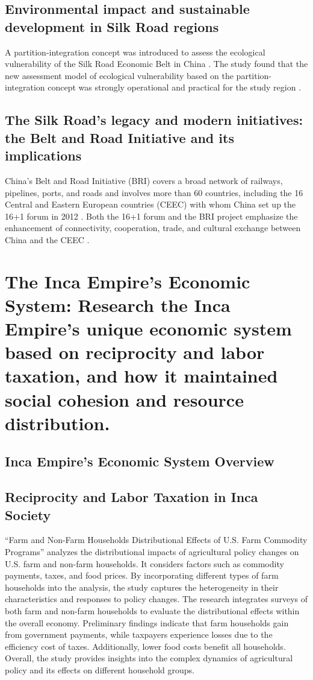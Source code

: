 \documentclass{article}
\begin{document}
\subsection{Environmental impact and sustainable development in Silk Road regions}

A partition-integration concept was introduced to assess the ecological vulnerability of the Silk Road Economic Belt in China \cite{Guo2019QuantitativeAM}. The study found that the new assessment model of ecological vulnerability based on the partition-integration concept was strongly operational and practical for the study region \cite{Guo2019QuantitativeAM}.

\subsection{The Silk Road's legacy and modern initiatives: the Belt and Road Initiative and its implications}

China's Belt and Road Initiative (BRI) covers a broad network of railways, pipelines, ports, and roads and involves more than 60 countries, including the 16 Central and Eastern European countries (CEEC) with whom China set up the 16+1 forum in 2012 \cite{Pepermans2018Chinas1A}. Both the 16+1 forum and the BRI project emphasize the enhancement of connectivity, cooperation, trade, and cultural exchange between China and the CEEC \cite{Pepermans2018Chinas1A}.


\section{The Inca Empire's Economic System: Research the Inca Empire's unique economic system based on reciprocity and labor taxation, and how it maintained social cohesion and resource distribution.}

\subsection{Inca Empire's Economic System Overview}

\subsection{Reciprocity and Labor Taxation in Inca Society}

\cite{Somwaru2003FarmAN} ``Farm and Non-Farm Households Distributional Effects of U.S. Farm Commodity Programs'' analyzes the distributional impacts of agricultural policy changes on U.S. farm and non-farm households. It considers factors such as commodity payments, taxes, and food prices. By incorporating different types of farm households into the analysis, the study captures the heterogeneity in their characteristics and responses to policy changes. The research integrates surveys of both farm and non-farm households to evaluate the distributional effects within the overall economy. Preliminary findings indicate that farm households gain from government payments, while taxpayers experience losses due to the efficiency cost of taxes. Additionally, lower food costs benefit all households. Overall, the study provides insights into the complex dynamics of agricultural policy and its effects on different household groups.
\end{document}
